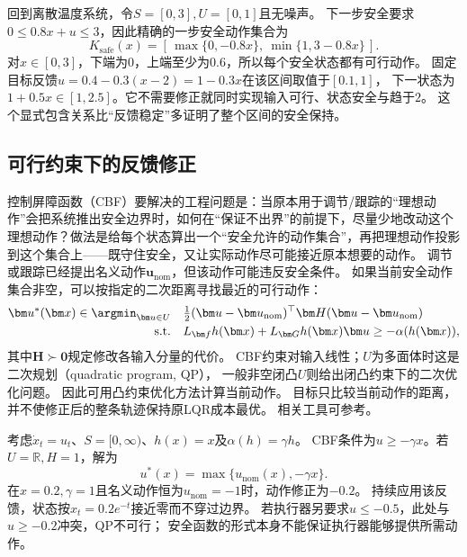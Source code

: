 回到离散温度系统，令$S=[0,3],U=[0,1]$且无噪声。
下一步安全要求$0\leq0.8x+u\leq3$，因此精确的一步安全动作集合为
\begin{equation}
  K_{\mathrm{safe}}(x)
  =[\,\max\{0,-0.8x\},\ \min\{1,3-0.8x\}\,].
  \label{eq:control-temperature-safe-actions}
\end{equation}
对$x\in[0,3]$，下端为$0$，上端至少为$0.6$，所以每个安全状态都有可行动作。
固定目标反馈$u=0.4-0.3(x-2)=1-0.3x$在该区间取值于$[0.1,1]$，
下一状态为$1+0.5x\in[1,2.5]$。它不需要修正就同时实现输入可行、状态安全与趋于$2$。
这个显式包含关系比“反馈稳定”多证明了整个区间的安全保持。

\subsection{可行约束下的反馈修正}
控制屏障函数（CBF）要解决的工程问题是：当原本用于调节/跟踪的“理想动作”会把系统推出安全边界时，如何在“保证不出界”的前提下，尽量少地改动这个理想动作？做法是给每个状态算出一个“安全允许的动作集合”，再把理想动作投影到这个集合上——既守住安全，又让实际动作尽可能接近原本想要的动作。
调节或跟踪已经提出名义动作$\bm u_{\mathrm{nom}}$，但该动作可能违反安全条件。
如果当前安全动作集合非空，可以按指定的二次距离寻找最近的可行动作：
\begin{equation}
  \begin{aligned}
  \bm u^\ast(\bm x)\in\argmin_{\bm u\in U}\quad&
    \tfrac12(\bm u-\bm u_{\mathrm{nom}})^\top
              \bm H(\bm u-\bm u_{\mathrm{nom}})\\
  \text{s.t.}\quad&
    L_{\bm f}h(\bm x)+L_{\bm G}h(\bm x)\bm u
       \geq-\alpha(h(\bm x)),
  \end{aligned}
  \label{eq:control-cbf-qp}
\end{equation}
其中$\bm H\succ\bm0$规定修改各输入分量的代价。
CBF约束对输入线性；$U$为多面体时这是二次规划（quadratic program, QP），
一般非空闭凸$U$则给出闭凸约束下的二次优化问题。
因此可用凸约束优化方法计算当前动作。
目标只比较当前动作的距离，并不使修正后的整条轨迹保持原LQR成本最优。
相关工具可参考。

\begin{example}[一维积分器上的安全投影]
\label{ex:control-cbf-scalar-projection}
考虑$\dot x_t=u_t$、$S=[0,\infty)$、$h(x)=x$及$\alpha(h)=\gamma h$。
CBF条件为$u\geq-\gamma x$。若$U=\mathbb R,H=1$，解为
\begin{equation}
  u^\ast(x)=\max\{u_{\mathrm{nom}}(x),-\gamma x\}.
  \label{eq:control-cbf-scalar-projection}
\end{equation}
在$x=0.2,\gamma=1$且名义动作恒为$u_{\mathrm{nom}}=-1$时，动作修正为$-0.2$。
持续应用该反馈，状态按$x_t=0.2e^{-t}$接近零而不穿过边界。
若执行器另要求$u\leq-0.5$，此处与$u\geq-0.2$冲突，QP不可行；
安全函数的形式本身不能保证执行器能够提供所需动作。
\end{example}

